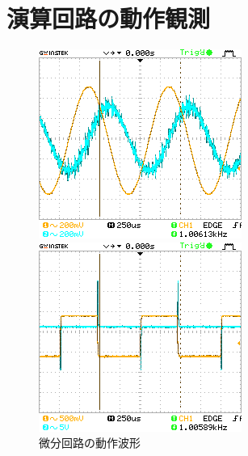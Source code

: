 \documentclass[dvipdfmx,titlepage,a4j]{jsarticle}  %
\begin{document}
\section{演算回路の動作観測}
\begin{figure}[H]
  \centering
  \begin{minipage}{8cm}
    \centering
    \includegraphics[keepaspectratio, scale=0.8]{../image/DS0000.png}
  \end{minipage}
  \begin{minipage}{8cm}
    \centering
    \includegraphics[keepaspectratio, scale=0.8]{../image/DS0001.png}
  \end{minipage}
  \caption{微分回路の動作波形}
  \label{fig:oc:case2}
\end{figure}
\end{document}
